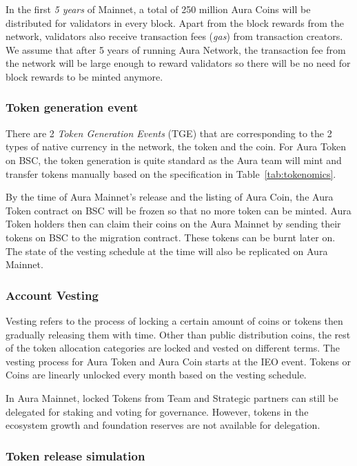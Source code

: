 \documentclass[11pt, titlepage]{article}
\begin{document}
In the first \emph{5 years} of Mainnet, a total of 250 million Aura Coins will be distributed for validators in every block. Apart from the block rewards from the network, validators also receive transaction fees (\emph{gas}) from transaction creators. We assume that after 5 years of running Aura Network, the transaction fee from the network will be large enough to reward validators so there will be no need for block rewards to be minted anymore.

\subsubsection{Token generation event}
There are 2 \emph{Token Generation Events} (TGE) that are corresponding to the 2 types of native currency in the network, the token and the coin. For Aura Token on BSC, the token generation is quite standard as the Aura team will mint and transfer tokens manually based on the specification in Table~\ref{tab:tokenomics}.

By the time of Aura Mainnet's release and the listing of Aura Coin, the Aura Token contract on BSC will be frozen so that no more token can be minted. Aura Token holders then can claim their coins on the Aura Mainnet by sending their tokens on BSC to the migration contract. These tokens can be burnt later on. The state of the vesting schedule at the time will also be replicated on Aura Mainnet. 

\subsubsection{Account Vesting}
Vesting refers to the process of locking a certain amount of coins or tokens then gradually releasing them with time. Other than public distribution coins, the rest of the token allocation categories are locked and vested on different terms. The vesting process for Aura Token and Aura Coin starts at the IEO event. Tokens or Coins are linearly unlocked every month based on the vesting schedule. 

In Aura Mainnet, locked Tokens from Team and Strategic partners can still be delegated for staking and voting for governance. However, tokens in the ecosystem growth and foundation reserves are not available for delegation. 

\subsubsection{Token release simulation}
\end{document}
